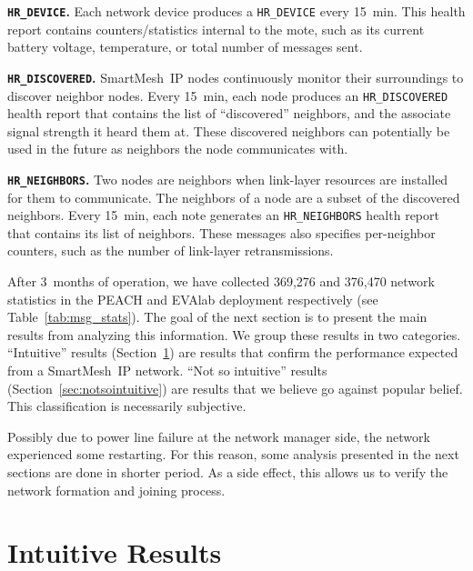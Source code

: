 \documentclass{elsarticle}
\newcommand{\smip}                {SmartMesh~IP\xspace}
\newcommand{\HRNEIGHBORS}         {{\tt HR\_NEIGHBORS}\xspace}
\newcommand{\HRDISCOVERED}        {{\tt HR\_DISCOVERED}\xspace}
\newcommand{\HRDEVICE}            {{\tt HR\_DEVICE}\xspace}
\newcommand{\PEACHNUMSTATS}       {369,276\xspace}
\newcommand{\EVANUMSTATS}   	  {376,470\xspace}
\begin{document}
\textbf{\HRDEVICE.}
Each network device produces a \HRDEVICE every 15~min.
This health report contains counters/statistics internal to the mote, such as its current battery voltage, temperature, or total number of messages sent.

\textbf{\HRDISCOVERED.}
\smip nodes continuously monitor their surroundings to discover neighbor nodes.
Every 15~min, each node produces an \HRDISCOVERED health report that contains the list of ``discovered'' neighbors, and the associate signal strength it heard them at.
These discovered neighbors can potentially be used in the future as neighbors the node communicates with.

\textbf{\HRNEIGHBORS.}
Two nodes are neighbors when link-layer resources are installed for them to communicate.
The neighbors of a node are a subset of the discovered neighbors.
Every 15~min, each note generates an \HRNEIGHBORS health report that contains its list of neighbors.
These messages also specifies per-neighbor counters, such as the number of link-layer retransmissions.


After 3~months of operation, we have collected \PEACHNUMSTATS and \EVANUMSTATS network statistics in the PEACH and EVAlab deployment respectively (see Table~\ref{tab:msg_stats}).
The goal of the next section is to present the main results from analyzing this information.
We group these results in two categories.
``Intuitive'' results (Section~\ref{sec:intuitive}) are results that confirm the performance expected from a \smip network.
``Not so intuitive'' results (Section~\ref{sec:notsointuitive}) are results that we believe go against popular belief.
This classification is necessarily subjective.

Possibly due to power line failure at the network manager side, the network experienced some restarting.
For this reason, some analysis presented in the next sections are done in shorter period.
As a side effect, this allows us to verify the network formation and joining process.

\section{Intuitive Results}
\label{sec:intuitive}
\end{document}
